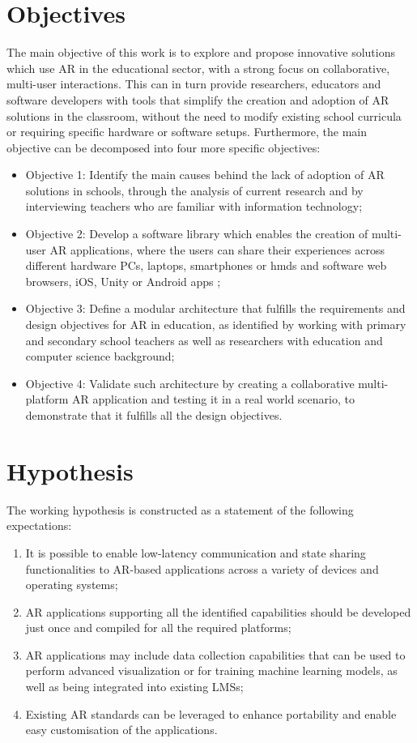 \section{Objectives}\label{sec:objectives}
The main objective of this work is to explore and propose innovative solutions which use AR in the educational sector, with a strong focus on collaborative, multi-user interactions. This can in turn provide researchers, educators and software developers with tools that simplify the creation and adoption of AR solutions in the classroom, without the need to modify existing school curricula or requiring specific hardware or software setups. Furthermore, the main objective can be decomposed into four more specific objectives:

\begin{itemize}
    \item Objective 1: Identify the main causes behind the lack of adoption of AR solutions in schools, through the analysis of current research and by interviewing teachers who are familiar with information technology;
    \item Objective 2: Develop a software library which enables the creation of multi-user AR applications, where the users can share their experiences across different hardware \textendash{} PCs, laptops, smartphones or \glspl{hmd} \textendash{} and software \textendash{} web browsers, iOS, Unity or Android apps \textendash{};
    \item Objective 3: Define a modular architecture that fulfills the requirements and design objectives for AR in education, as identified by working with primary and secondary school teachers as well as researchers with education and computer science background;
    \item Objective 4: Validate such architecture by creating a collaborative multi-platform AR application and testing it in a real world scenario, to demonstrate that it fulfills all the design objectives.
\end{itemize}

\section{Hypothesis}\label{sec:hypothesis}
The working hypothesis is constructed as a statement of the following expectations:
\begin{enumerate}
    \item It is possible to enable low-latency communication and state sharing functionalities to AR-based applications across a variety of devices and operating systems;
    \item AR applications supporting all the identified capabilities should be developed just once and compiled for all the required platforms;
    \item AR applications may include data collection capabilities that can be used to perform advanced visualization or for training machine learning models, as well as being integrated into existing LMSs;
    \item Existing AR standards can be leveraged to enhance portability and enable easy customisation of the applications.
\end{enumerate}

